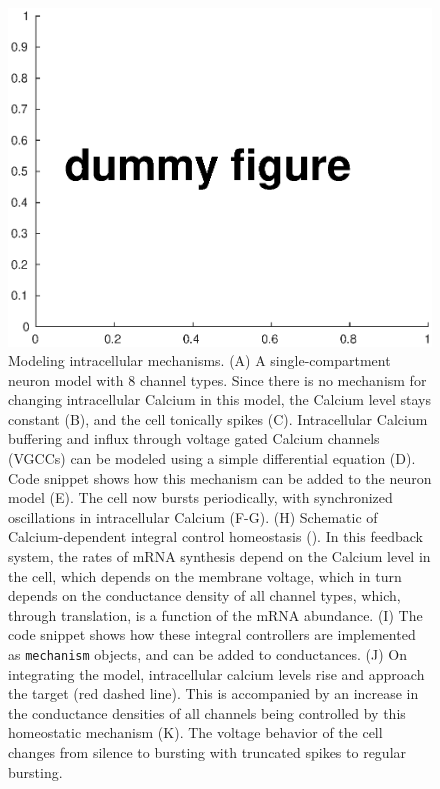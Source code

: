 \documentclass{frontiersSCNS} %
\begin{document}
\begin{figure}[!htb]
	\centering
	\includegraphics[width=1.0\linewidth]{gfx/figure_mechanism}
	\caption{Modeling intracellular mechanisms. (A) A single-compartment neuron model with 8 channel types. Since there is no mechanism for changing intracellular Calcium in this model, the Calcium level stays constant (B), and the cell tonically spikes (C). Intracellular Calcium buffering and influx through voltage gated Calcium channels (VGCCs) can be modeled using a simple differential equation (D). Code snippet shows how this mechanism can be added to the neuron model (E). The cell now bursts periodically, with synchronized oscillations in intracellular Calcium (F-G). (H) Schematic of Calcium-dependent integral control homeostasis (\cite{olearyCorrelationsIonChannel2013, olearyCellTypesNetwork2014}). In this feedback system, the rates of mRNA synthesis depend on the Calcium level in the cell, which depends on the membrane voltage, which in turn depends on the conductance density of all channel types, which, through translation, is a function of the mRNA abundance. (I) The code snippet shows how these integral controllers are implemented as \texttt{mechanism} objects, and can be added to conductances. (J) On integrating the model, intracellular calcium levels rise and approach the target (red dashed line). This is accompanied by an increase in the conductance densities of all channels being controlled by this homeostatic mechanism (K). The voltage behavior of the cell changes from silence to bursting with truncated spikes to regular bursting.}
	\label{fig:figuremechanism}
\end{figure}
\end{document}
